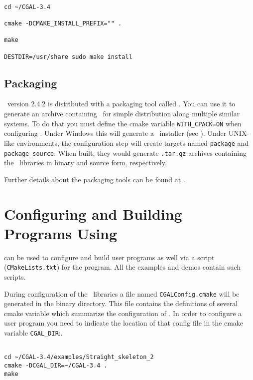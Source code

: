 {\ccTexHtml{\scriptsize}{}
\begin{verbatim}

cd ~/CGAL-3.4

cmake -DCMAKE_INSTALL_PREFIX="" . 

make

DESTDIR=/usr/share sudo make install

\end{verbatim}
}

\subsection{Packaging \cgal}

\cmake\ version 2.4.2 is distributed with a packaging tool called \cpack. You can use it to generate an archive containing
\cgal\ for simple distribution along multiple similar systems. To do that you must define the cmake variable
{\tt WITH\_CPACK=ON} when configuring \cgal.
Under Windows this will generate a \nsis\ installer (see \nsispage).
Under UNIX-like environments, the configuration step will create targets named {\tt package} and {\tt package\_source}. When built, they would generate 
{\tt .tar.gz} archives containing the \cgal\ libraries in binary and source form, respectively.

Further details about the packaging tools can be found at \cpackpage.

\section{Configuring and Building Programs Using \cgal}

\cmake can be used to configure and build user programs as well via a \cmake script ({\tt CMakeLists.txt}) for the program.
All the examples and demos contain such \cmake scripts.

During configuration of the \cgal\ libraries a file named {\tt CGALConfig.cmake} will be generated in the binary directory. This file contains
the definitions of several cmake variable which summarize the configuration of \cgal. In order to configure a user program you need to indicate
the location of that config file in the cmake variable {\tt CGAL\_DIR}:.

{\ccTexHtml{\scriptsize}{}
\begin{verbatim}

cd ~/CGAL-3.4/examples/Straight_skeleton_2
cmake -DCGAL_DIR=~/CGAL-3.4 .
make

\end{verbatim}
}

